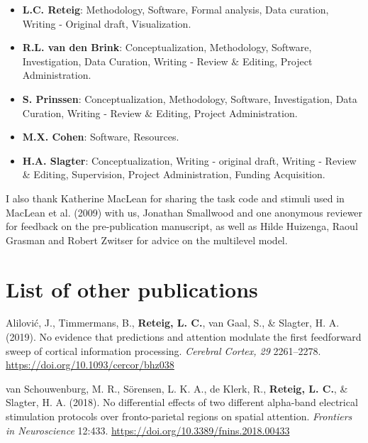 \documentclass[11pt,english,]{memoir}
\providecommand{\tightlist}{%
  \setlength{\itemsep}{0pt}\setlength{\parskip}{0pt}}
\begin{document}
\begin{itemize}
\tightlist
\item
  \textbf{L.C. Reteig}: Methodology, Software, Formal analysis, Data curation, Writing - Original draft, Visualization.
\item
  \textbf{R.L. van den Brink}: Conceptualization, Methodology, Software, Investigation, Data Curation, Writing - Review \& Editing, Project Administration.
\item
  \textbf{S. Prinssen}: Conceptualization, Methodology, Software, Investigation, Data Curation, Writing - Review \& Editing, Project Administration.
\item
  \textbf{M.X. Cohen}: Software, Resources.
\item
  \textbf{H.A. Slagter}: Conceptualization, Writing - original draft, Writing - Review \& Editing, Supervision, Project Administration, Funding Acquisition.
\end{itemize}

\begin{list}{}{\leftmargin=1.5em\rightmargin=0pt}
\item
I also thank Katherine MacLean for sharing the task code and stimuli used in MacLean et al. (2009) with us, Jonathan Smallwood and one anonymous reviewer for feedback on the pre-publication manuscript, as well as Hilde Huizenga, Raoul Grasman and Robert Zwitser for advice on the multilevel model.
\end{list}

\hypertarget{list-of-other-publications}{%
\chapter*{List of other publications}\label{list-of-other-publications}}


Alilović, J., Timmermans, B., \textbf{Reteig, L. C.}, van Gaal, S., \& Slagter, H. A. (2019). No evidence that predictions and attention modulate the first feedforward sweep of cortical information processing. \emph{Cerebral Cortex, 29} 2261--2278. \url{https://doi.org/10.1093/cercor/bhz038}\newline

van Schouwenburg, M. R., Sörensen, L. K. A., de Klerk, R., \textbf{Reteig, L. C.}, \& Slagter, H. A. (2018). No differential effects of two different alpha-band electrical stimulation protocols over fronto-parietal regions on spatial attention. \emph{Frontiers in Neuroscience} 12:433. \url{https://doi.org/10.3389/fnins.2018.00433}\newline
\end{document}
